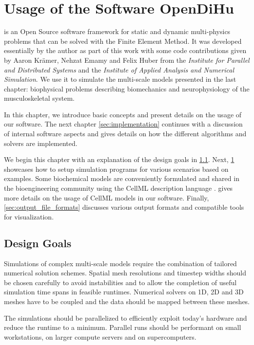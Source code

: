 \chapter{Usage of the Software OpenDiHu}\label{sec:usage}

\Opendihu{} is an Open Source software framework for static and dynamic multi-physics problems that can be solved with the Finite Element Method. 
It was developed essentially by the author as part of this work with some code contributions given by Aaron Krämer, Nehzat Emamy and Felix Huber from the \emph{Institute for Parallel and Distributed Systems} and the \emph{Institute of Applied Analysis and Numerical Simulation}.
We use it to simulate the multi-scale models presented in the last chapter: biophysical problems describing biomechanics and neurophysiology of the musculoskeletal system.

In this chapter, we introduce basic concepts and present details on the usage of our software. The next chapter \cref{sec:implementation} continues with a discussion of internal software aspects and gives details on how the different algorithms and solvers are implemented.

We begin this chapter with an explanation of the design goals in \cref{sec:design_goals}. Next, \cref{sec:usage} showcases how to setup simulation programs for various scenarios based on examples. Some biochemical models are conveniently formulated and shared in the bioengineering community using the CellML description language \cite{Cellml2003}.  gives more details on the usage of CellML models in our software. Finally, \cref{sec:output_file_formats} discusses various output formats and compatible tools for visualization.

\section{Design Goals}\label{sec:design_goals}

Simulations of complex multi-scale models require the combination of tailored numerical solution schemes. Spatial mesh resolutions and timestep widths should be chosen carefully to avoid instabilities and to allow the completion of useful simulation time spans in feasible runtimes.
Numerical solvers on 1D, 2D and 3D meshes have to be coupled and the data should be mapped between these meshes. 

The simulations should be parallelized to efficiently exploit today's hardware and reduce the runtime to a minimum. Parallel runs should be performant on small workstations, on larger compute servers and on supercomputers. 

